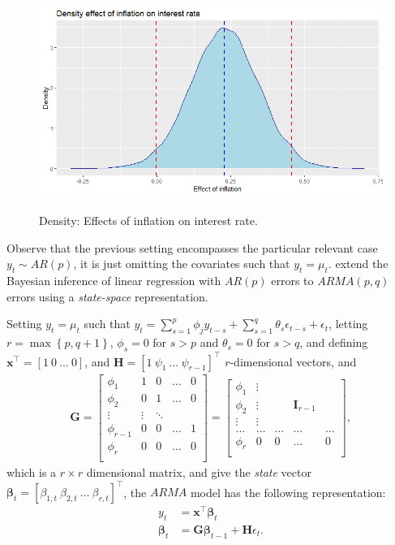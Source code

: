 \begin{figure}[!h]
	\includegraphics[width=340pt, height=200pt]{Chapters/chapter8/figures/InfInt.png}
	\caption[List of figure caption goes here]{Density: Effects of inflation on interest rate.}\label{fig3}
\end{figure} 

Observe that the previous setting encompasses the particular relevant case  $y_t\sim AR(p)$, it is just omitting the covariates such that $y_t=\mu_t$. \cite{chib1994bayes} extend the Bayesian inference of linear regression with $AR(p)$ errors to $ARMA(p,q)$ errors using a \textit{state-space} representation. 

Setting $y_t=\mu_t$ such that $y_t=\sum_{s=1}^{p}\phi_jy_{t-s}+\sum_{s=1}^{q}\theta_s \epsilon_{t-s}+\epsilon_t$, letting $r=\max \left\{p,q+1\right\}$, $\phi_s=0$ for $s>p$ and $\theta_s=0$ for $s>q$, and defining $\bm{x}^{\top}=[1 \ 0 \ \dots \ 0]$, and $\bm{H}=[1 \ \psi_1 \ \dots \ \psi_{r-1}]^{\top}$ $r$-dimensional vectors, and 
\begin{align*}
	\bm{G}=\begin{bmatrix}
		\phi_1 & 1 & 0 & \dots & 0\\
		\phi_2 & 0 & 1 & \dots & 0\\
		\vdots & \vdots & \ddots &  &\\
		\phi_{r-1} & 0 & 0 & \dots & 1\\
		\phi_r & 0 & 0 & \dots & 0\\
	\end{bmatrix} = \begin{bmatrix}
		\phi_1 & \vdots &  &  & \\
		\phi_2 & \vdots &  & \bm{I}_{r-1}  & \\
		\vdots & \vdots &  &  &\\
		\dots & \dots & \dots & \dots & \dots\\
		\phi_r & 0 & 0 & \dots & 0\\
	\end{bmatrix},
\end{align*} 
which is a $r\times r$ dimensional matrix, and give the \textit{state} vector $\bm{\beta}_t=[\beta_{1,t} \ \beta_{2,t} \ \dots \ \beta_{r,t}]^{\top}$, the $ARMA$ model has the following representation:
\begin{align*}
	y_t&=\bm{x}^{\top}\bm{\beta}_t\\
	\bm{\beta}_t &= \bm{G}\bm{\beta}_{t-1}+\bm{H}\epsilon_{t}.
\end{align*}

